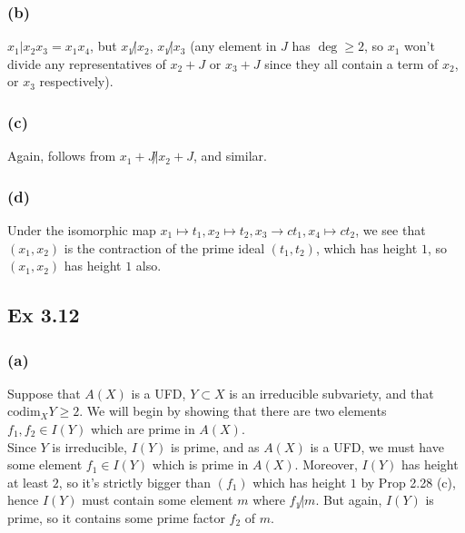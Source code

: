 \documentclass{article}
\theoremstyle{definition}
\newcommand{\codim}{\text{codim}}
\begin{document}
\subsubsection*{(b)} 

$x_1 | x_2x_3 = x_1x_4$, but $x_1 \not | x_2$, $x_1 \not | x_3$ (any element in
$J$ has $\deg \geq 2$, so $x_1$ won't divide any representatives of $x_2 + J$
or $x_3 + J$ since they all contain a term of $x_2$, or $x_3$ respectively).

\subsubsection*{(c)} 

Again, follows from $x_1 + J \not | x_2 + J$, and similar.

\subsubsection*{(d)} 

Under the isomorphic map $x_1 \mapsto t_1, x_2 \mapsto t_2, x_3 \to c t_1, x_4
\mapsto c t_2$, we see that $(x_1, x_2)$ is the contraction of the prime ideal
$(t_1, t_2)$, which has height $1$, so $(x_1, x_2)$ has height $1$ also. \\


\subsection*{Ex 3.12} 

\subsubsection*{(a)} 

Suppose that $A(X)$ is a UFD, $Y \subset X$ is an irreducible subvariety, and
that $\codim_X Y \geq 2$. We will begin by showing that there are two elements
$f_1, f_2 \in I(Y)$ which are prime in $A(X)$. \\

Since $Y$ is irreducible, $I(Y)$ is prime, and as $A(X)$ is a UFD, we must have
some element $f_1 \in I(Y)$ which is prime in $A(X)$. Moreover, $I(Y)$ has
height at least $2$, so it's strictly bigger than $(f_1)$ which has height $1$
by Prop 2.28 (c), hence $I(Y)$ must contain some element $m$ where $f_1 \not |
m$. But again, $I(Y)$ is prime, so it contains some prime factor $f_2$ of $m$.
\\
\end{document}
